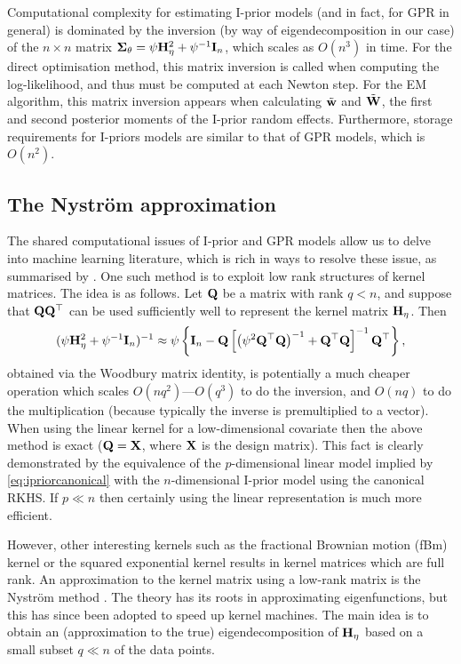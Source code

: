 Computational complexity for estimating I-prior models (and in fact, for GPR in general) is dominated by the inversion (by way of eigendecomposition in our case) of the $n \times n$ matrix ${\bm\Sigma}_\theta = \psi{\mathbf H}_\eta^2 + \psi^{-1}{\mathbf I}_n$, which scales as $O(n^3)$ in time.
For the direct optimisation method, this matrix inversion is called when computing the log-likelihood, and thus must be computed at each Newton step.
For the EM algorithm, this matrix inversion appears when calculating $\tilde {{\mathbf w}}$ and $\tilde {{\mathbf W}}$, the first and second posterior moments of the I-prior random effects.
Furthermore, storage requirements for I-priors models are similar to that of GPR models, which is $O(n^2)$.

\subsection[The Nystrom approximation]{The Nyström approximation}

The shared computational issues of I-prior and GPR models allow us to delve into machine learning literature, which is rich in ways to resolve these issue, as summarised by \citet{quinonero2005unifying}.
One such method is to exploit low rank structures of kernel matrices.
The idea is as follows.
Let ${\mathbf Q}$ be a matrix with rank $q < n$, and suppose that ${\mathbf Q}{\mathbf Q}^\top$ can be used sufficiently well to represent the kernel matrix ${\mathbf H}_\eta$.
Then
\[
  (\psi{\mathbf H}_\eta^2 + \psi^{-1}{\mathbf I}_n)^{-1} \approx
  \psi\left\{
  {\mathbf I}_n -
  {\mathbf Q}\left[ \big(\psi^{2}{\mathbf Q}^\top{\mathbf Q}\big)^{-1} +{\mathbf Q}^\top{\mathbf Q} \right]^{-1} {\mathbf Q}^\top
  \right\},
\]
obtained via the Woodbury matrix identity, is potentially a much cheaper operation which scales $O(nq^2)$---$O(q^3)$ to do the inversion, and $O(nq)$ to do the multiplication (because typically the inverse is premultiplied to a vector).
When using the linear kernel for a low-dimensional covariate then the above method is exact (${\mathbf Q} = {\mathbf X}$, where ${\mathbf X}$ is the design matrix).
This fact is clearly demonstrated by the equivalence of the $p$-dimensional linear model implied by \cref{eq:ipriorcanonical} with the $n$-dimensional I-prior model using the canonical RKHS.
If $p \ll n$ then certainly using the linear representation is much more efficient.

However, other interesting kernels such as the fractional Brownian motion (fBm) kernel or the squared exponential kernel results in kernel matrices which are full rank.
An approximation to the kernel matrix using a low-rank matrix is the Nystr\"om method \citep{williams2001using}.
The theory has its roots in approximating eigenfunctions, but this has since been adopted to speed up kernel machines.
The main idea is to obtain an (approximation to the true) eigendecomposition of ${\mathbf H}_\eta$ based on a small subset $q \ll n$ of the data points.

